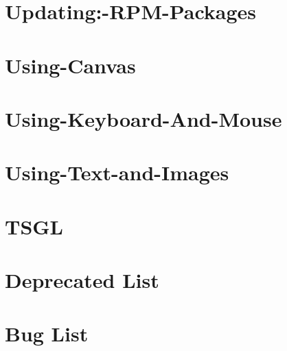 \documentclass[twoside]{book}
\begin{document}
\chapter{Updating\-:-\/\-R\-P\-M-\/\-Packages}
\label{md__home_kodemonkey_workspace__t_s_g_l_docs-wiki__updating_1-_r_p_m-_packages}
\hypertarget{md__home_kodemonkey_workspace__t_s_g_l_docs-wiki__updating_1-_r_p_m-_packages}{}

\chapter{Using-\/\-Canvas}
\label{md__home_kodemonkey_workspace__t_s_g_l_docs-wiki__using-_canvas}
\hypertarget{md__home_kodemonkey_workspace__t_s_g_l_docs-wiki__using-_canvas}{}

\chapter{Using-\/\-Keyboard-\/\-And-\/\-Mouse}
\label{md__home_kodemonkey_workspace__t_s_g_l_docs-wiki__using-_keyboard-_and-_mouse}
\hypertarget{md__home_kodemonkey_workspace__t_s_g_l_docs-wiki__using-_keyboard-_and-_mouse}{}

\chapter{Using-\/\-Text-\/and-\/\-Images}
\label{md__home_kodemonkey_workspace__t_s_g_l_docs-wiki__using-_text-and-_images}
\hypertarget{md__home_kodemonkey_workspace__t_s_g_l_docs-wiki__using-_text-and-_images}{}

\chapter{T\-S\-G\-L}
\label{md__home_kodemonkey_workspace__t_s_g_l_readme}
\hypertarget{md__home_kodemonkey_workspace__t_s_g_l_readme}{}

\chapter{Deprecated List}
\label{deprecated}
\hypertarget{deprecated}{}

\chapter{Bug List}
\label{bug}
\hypertarget{bug}{}

\end{document}
